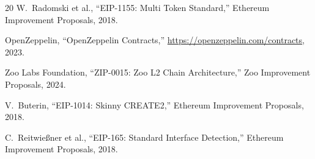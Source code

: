\documentclass[11pt,letterpaper]{article}
\begin{document}
\begin{thebibliography}{20}
W.~Radomski et al., ``EIP-1155: Multi Token Standard,'' Ethereum Improvement Proposals, 2018.

OpenZeppelin, ``OpenZeppelin Contracts,'' \url{https://openzeppelin.com/contracts}, 2023.

Zoo Labs Foundation, ``ZIP-0015: Zoo L2 Chain Architecture,'' Zoo Improvement Proposals, 2024.

V.~Buterin, ``EIP-1014: Skinny CREATE2,'' Ethereum Improvement Proposals, 2018.

C.~Reitwie{\ss}ner et al., ``EIP-165: Standard Interface Detection,'' Ethereum Improvement Proposals, 2018.

\end{thebibliography}
\end{document}
